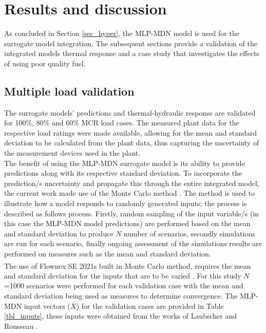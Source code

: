 \documentclass[a4paper,fleqn]{cas-dc}
\begin{document}
\section{Results and discussion}\label{sec_results_diss}
As concluded in Section \ref{sec_hyper}, the MLP-MDN model is used for the surrogate model integration. The subsequent sections provide a validation of the integrated models thermal response and a case study that investigates the effects of using poor quality fuel. 

\subsection{Multiple load validation}\label{sec_result_1}
The surrogate models' predictions and thermal-hydraulic response are validated for 100\%, 80\% and 60\% MCR load cases. The measured plant data for the respective load ratings were made available, allowing for the mean and standard deviation to be calculated from the plant data, thus capturing the uncertainty of the measurement devices used in the plant.\\ 

The benefit of using the MLP-MDN surrogate model is its ability to provide predictions along with  its respective standard deviation. To incorporate the prediction/s uncertainty and propagate this through the entire integrated model, the current work made use of the Monte Carlo method \cite{Thomopoulos2013}. The method is used to illustrate how a model responds to randomly generated inputs; the process is described as follows process. Firstly, random sampling of the input variable/s (in this case the MLP-MDN model predictions) are performed based on the mean and standard deviation to produce $N$ number of scenarios, secondly simulations are run for each scenario, finally ongoing assessment of the simulations results are performed on measures such as the mean and standard deviation.\\ 

The use of Flownex SE\textsuperscript{\textregistered} 2021s built in Monte Carlo method, requires the mean and standard deviation for the inputs that are to be varied \cite{flownex}. For this study $N$=1000 scenarios were performed for each validation case with the mean and standard deviation being used as measures to determine convergence. The MLP-MDN input vectors ($\overline{X}$) for the validation cases are provided in Table \ref{tbl_inputs}, these inputs were obtained from the works of Laubscher and Rousseau \cite{Laubscher2019b}.\\
\end{document}

